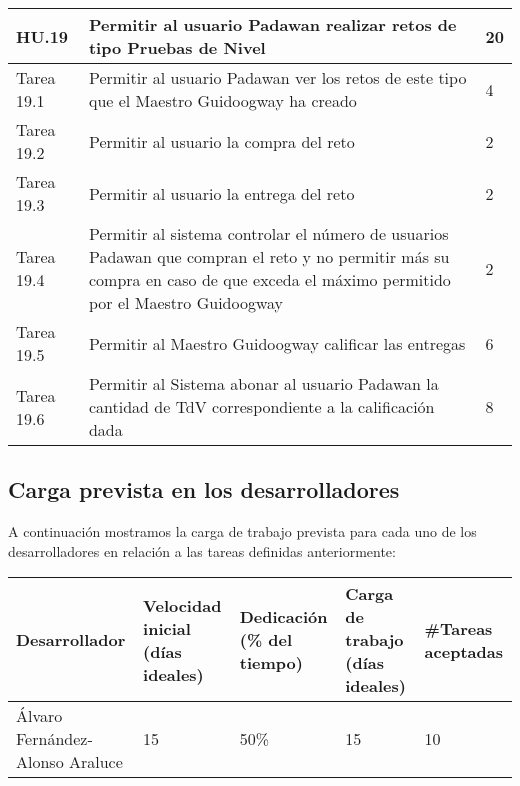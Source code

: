 \begin{table}[t]
	\centering
	\begin{tabular}{| p{2.3cm} | p{6.7cm} | p{2cm} |}
		\rowcolor[HTML]{329A9D} 
		{\color[HTML]{FFFFFF} \textbf{HU.19}} & {\color[HTML]{FFFFFF} \textbf{Permitir al usuario Padawan realizar retos de tipo Pruebas de Nivel}} & {\color[HTML]{FFFFFF} \textbf{20}}  \\ \hline
		Tarea 19.1 & Permitir al usuario Padawan ver los retos de este tipo que el Maestro Guidoogway ha creado & 4 \\ \hline
		Tarea 19.2 & Permitir al usuario la compra del reto & 2 \\ \hline
		Tarea 19.3 & Permitir al usuario la entrega del reto & 2 \\ \hline
		Tarea 19.4 & Permitir al sistema controlar el número de usuarios Padawan que compran el reto y no permitir más su compra en caso de que exceda el máximo permitido por el Maestro Guidoogway & 2 \\ \hline
		Tarea 19.5 & Permitir al Maestro Guidoogway calificar las entregas & 6 \\ \hline
		Tarea 19.6 & Permitir al Sistema abonar al usuario Padawan la cantidad de TdV correspondiente a la calificación dada & 8 \\ \hline
	\end{tabular}
\end{table}

\newpage
\FloatBarrier

\subsection{Carga prevista en los desarrolladores}

A continuación mostramos la carga de trabajo prevista para cada uno de los desarrolladores en relación a las tareas definidas anteriormente:

\begin{table}[h]
	\centering
	\begin{tabular}{| p{3cm} | p{2cm} | p{2cm} | p{2cm} | p{2cm} |}
		\rowcolor[HTML]{329A9D} 
		{\color[HTML]{FFFFFF} \textbf{Desarrollador}} & {\color[HTML]{FFFFFF} \textbf{Velocidad inicial (días ideales)}} & {\color[HTML]{FFFFFF} \textbf{Dedicación (\% del tiempo)}} & {\color[HTML]{FFFFFF} \textbf{Carga de trabajo (días ideales)}} & {\color[HTML]{FFFFFF} \textbf{\#Tareas aceptadas}}  \\ \hline
		Álvaro Fernández-Alonso Araluce & 15 & 50\% & 15 & 10 \\ \hline
	\end{tabular}
\end{table}

